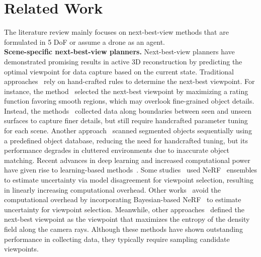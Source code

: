 \section{Related Work}
\label{sec:rel}

The literature review mainly focuses on next-best-view methods that are formulated in 5 DoF or assume a drone as an agent.\\
\textbf{Scene-specific next-best-view planners.} Next-best-view planners have demonstrated promising results in active 3D reconstruction by predicting the optimal viewpoint for data capture based on the current state.
Traditional approaches~\cite{monica2018contour, zha1997next, liu2018object, hardouin2020surface, hardouin2020next, dai2020fast, zhou2021fuel} rely on hand-crafted rules to determine the next-best viewpoint. 
For instance, the method~\cite{zha1997next} selected the next-best viewpoint by maximizing a rating function favoring smooth regions, which may overlook fine-grained object details.
Instead, the methods~\cite{monica2018contour, hardouin2020surface} collected data along boundaries between seen and unseen surfaces to capture finer details, but still require handcrafted parameter tuning for each scene.
Another approach~\cite{liu2018object} scanned segmented objects sequentially using a predefined object database, reducing the need for handcrafted tuning, but its performance degrades in cluttered environments due to inaccurate object matching.
Recent advances in deep learning and increased computational power have given rise to learning-based methods~\cite{lin2022active, pan2022activenerf, lee2022uncertainty, zhan2022activermap, jin2023neu, sunderhauf2023density, chen2024gennbv, peralta2020next, ran2023neurar, zeng2022efficient, tao2022seer, wilson2025pop, li2025activesplat}.
Some studies~\cite{lin2022active, sunderhauf2023density} used NeRF~\cite{mildenhall2020nerf} ensembles to estimate uncertainty via model disagreement for viewpoint selection, resulting in linearly increasing computational overhead.
Other works~\cite{pan2022activenerf, ran2023neurar, zeng2022efficient} avoid the computational overhead by incorporating Bayesian-based NeRF~\cite{shen2021stochastic, martin2021nerf} to estimate uncertainty for viewpoint selection.
Meanwhile, other approaches~\cite{lee2022uncertainty, zhan2022activermap} defined the next-best viewpoint as the viewpoint that maximizes the entropy of the density field along the camera rays.
Although these methods have shown outstanding performance in collecting data, they typically require sampling candidate viewpoints.
